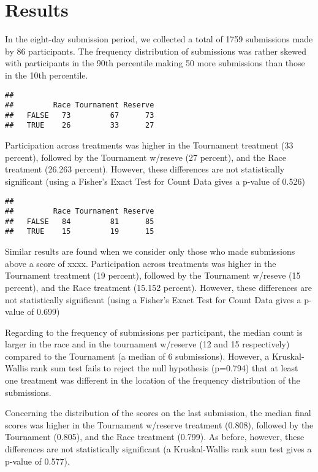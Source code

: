 \documentclass[12pt,]{article}
\begin{document}
\section{Results}\label{results}

In the eight-day submission period, we collected a total of 1759
submissions made by 86 participants. The frequency distribution of
submissions was rather skewed with participants in the 90th percentile
making 50 more submissions than those in the 10th percentile.

\begin{verbatim}
##        
##         Race Tournament Reserve
##   FALSE   73         67      73
##   TRUE    26         33      27
\end{verbatim}

Participation across treatments was higher in the Tournament treatment
(33 percent), followed by the Tournament w/reseve (27 percent), and the
Race treatment (26.263 percent). However, these differences are not
statistically significant (using a Fisher's Exact Test for Count Data
gives a p-value of 0.526)

\begin{verbatim}
##        
##         Race Tournament Reserve
##   FALSE   84         81      85
##   TRUE    15         19      15
\end{verbatim}

Similar results are found when we consider only those who made
submissions above a score of xxxx. Participation across treatments was
higher in the Tournament treatment (19 percent), followed by the
Tournament w/reseve (15 percent), and the Race treatment (15.152
percent). However, these differences are not statistically significant
(using a Fisher's Exact Test for Count Data gives a p-value of 0.699)

Regarding to the frequency of submissions per participant, the median
count is larger in the race and in the tournament w/reserve (12 and 15
respectively) compared to the Tournament (a median of 6 submissions).
However, a Kruskal-Wallis rank sum test fails to reject the null
hypothesis (p=0.794) that at least one treatment was different in the
location of the frequency distribution of the submissions.

Concerning the distribution of the scores on the last submission, the
median final scores was higher in the Tournament w/reserve treatment
(0.808), followed by the Tournament (0.805), and the Race treatment
(0.799). As before, however, these differences are not statistically
significant (a Kruskal-Wallis rank sum test gives a p-value of 0.577).
\end{document}

